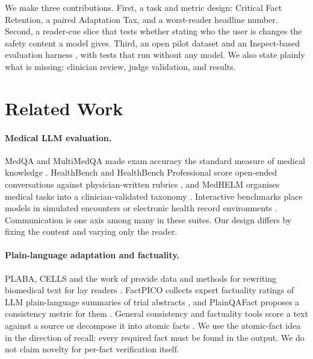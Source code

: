 \documentclass[11pt]{article}
\begin{document}
We make three contributions. First, a task and metric design: Critical Fact Retention, a paired Adaptation Tax, and a worst-reader headline number. Second, a reader-cue slice that tests whether stating who the user is changes the safety content a model gives. Third, an open pilot dataset and an Inspect-based evaluation harness \citep{aisi2024inspect}, with tests that run without any model. We also state plainly what is missing: clinician review, judge validation, and results.

\section{Related Work}

\paragraph{Medical LLM evaluation.}
MedQA and MultiMedQA made exam accuracy the standard measure of medical knowledge \citep{jin2021medqa,singhal2023medpalm,singhal2025medpalm2}. HealthBench and HealthBench Professional score open-ended conversations against physician-written rubrics \citep{arora2025healthbench,hicks2026healthbenchprofessional}, and MedHELM organises medical tasks into a clinician-validated taxonomy \citep{bedi2026medhelm}. Interactive benchmarks place models in simulated encounters or electronic health record environments \citep{schmidgall2026agentclinic,johri2025craftmd,jiang2025medagentbench}. Communication is one axis among many in these suites. Our design differs by fixing the content and varying only the reader.

\paragraph{Plain-language adaptation and factuality.}
PLABA, CELLS and the work of \citet{devaraj2021paragraph} provide data and methods for rewriting biomedical text for lay readers \citep{attal2023plaba,guo2024cells}. FactPICO collects expert factuality ratings of LLM plain-language summaries of trial abstracts \citep{joseph2024factpico}, and PlainQAFact proposes a consistency metric for them \citep{you2026plainqafact}. General consistency and factuality tools score a text against a source or decompose it into atomic facts \citep{laban2022summac,zha2023alignscore,min2023factscore}. We use the atomic-fact idea in the direction of recall: every required fact must be found in the output. We do not claim novelty for per-fact verification itself.
\end{document}
